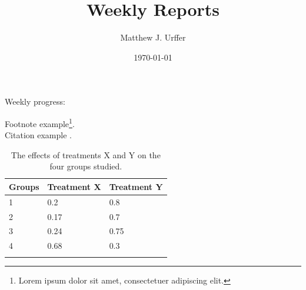 \documentclass[paper=a4,twoside,captions=tableheading,index=totoc,hyperref]{labbook}
\begin{document}
\title{Weekly Reports}
\author{Matthew J. Urffer}
\date{\today}
\maketitle

\listoftodos
\printnomenclature
\printindex
\tableofcontents
\listoffigures
\listoftables
\lstlistoflistings

\newpage %

\pagestyle{scrheadings} %


Weekly progress:

\lipsum[1]



\lipsum[2]

Footnote example\footnote{Lorem ipsum dolor sit amet, consectetuer adipiscing elit.}.\\

Citation example \cite{lamport94}.



\lipsum[3]

\begin{table}
\label{tab:treatments_xy}
\raggedleft
\begin{tabular}{l l l}
\toprule
\textbf{Groups} & \textbf{Treatment X} & \textbf{Treatment Y} \\
\toprule
1 & 0.2 & 0.8\\
2 & 0.17 & 0.7\\
3 & 0.24 & 0.75\\
4 & 0.68 & 0.3\\
\bottomrule\\
\end{tabular}
\caption{The effects of treatments X and Y on the four groups studied.}
\end{table}

\end{document}
